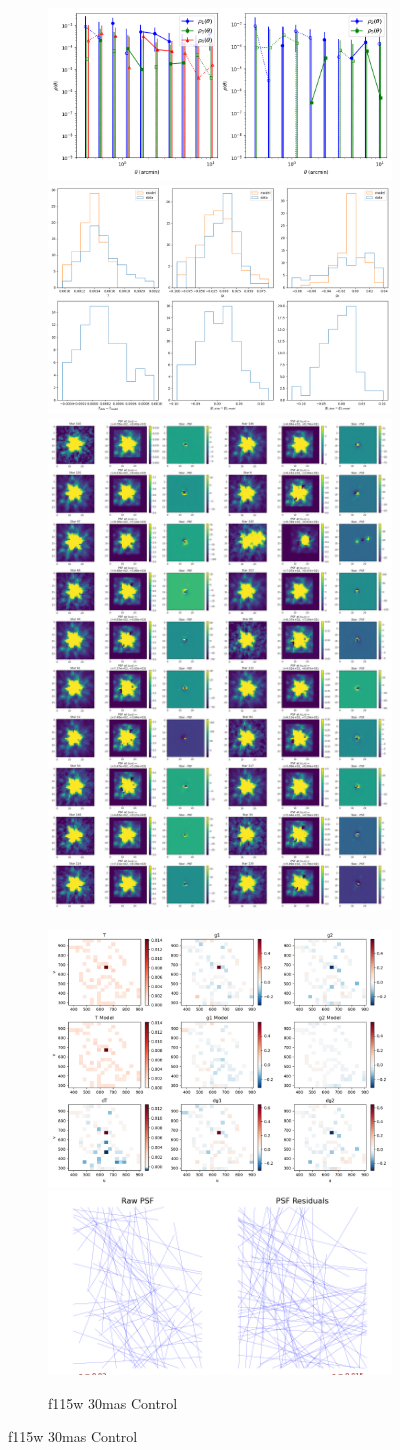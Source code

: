 \documentclass[a4 paper]{article}
\numberwithin{equation}{section}
\newcommand{\0}{\mathbf{0}}
\begin{document}
\begin{figure}[!h]
  \begin{subfigure}{\linewidth}
  \includegraphics[width=.3\linewidth]{30Control/piff_rho.png}\hfill
  \includegraphics[width=.3\linewidth]{30Control/piff_shapes.png}\hfill
  \includegraphics[width=.3\linewidth]{30Control/piff_stars.png}
  \end{subfigure}\par\medskip
  \begin{subfigure}{\linewidth}
  \includegraphics[width=.3\linewidth]{30Control/piff_twod.png}\hfill
  \includegraphics[width=.3\linewidth]{30Control/piff_whisker.png}\hfill
  \caption{f115w 30mas Control}
  \end{subfigure}\par\medskip


\end{figure} \clearpage
\end{document}
